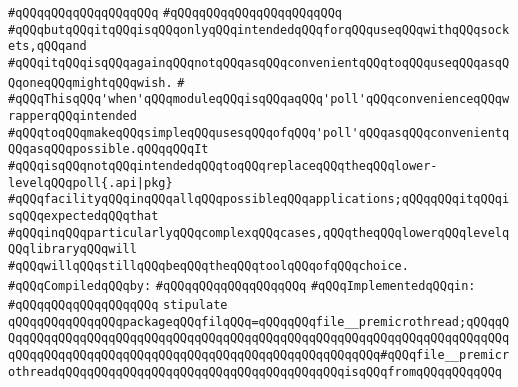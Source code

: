 \verb|#qQQqqQQqqQQqqQQqqQQq|\newline
\verb|#qQQqqQQqqQQqqQQqqQQq|\verb|qQQq|\newline
\verb|#qQQqbutqQQqitqQQqisqQQqonlyqQQqintendedqQQqforqQQquseqQQqwithqQQqsockets,qQQqand|\newline
\verb|#qQQqitqQQqisqQQqagainqQQqnotqQQqasqQQqconvenientqQQqtoqQQquseqQQqasqQQqoneqQQqmightqQQqwish.|\newline
\verb|#|\newline
\verb|#qQQqThisqQQq'when'qQQqmoduleqQQqisqQQqaqQQq'poll'qQQqconvenienceqQQqwrapperqQQqintended|\newline
\verb|#qQQqtoqQQqmakeqQQqsimpleqQQqusesqQQqofqQQq'poll'qQQqasqQQqconvenientqQQqasqQQqpossible.qQQqqQQqIt|\newline
\verb|#qQQqisqQQqnotqQQqintendedqQQqtoqQQqreplaceqQQqtheqQQqlower-levelqQQqpoll{.api|\verb#|pkg}#\newline
\verb|#qQQqfacilityqQQqinqQQqallqQQqpossibleqQQqapplications;qQQqqQQqitqQQqisqQQqexpectedqQQqthat|\newline
\verb|#qQQqinqQQqparticularlyqQQqcomplexqQQqcases,qQQqtheqQQqlowerqQQqlevelqQQqlibraryqQQqwill|\newline
\verb|#qQQqwillqQQqstillqQQqbeqQQqtheqQQqtoolqQQqofqQQqchoice.|\newline
\newline
\verb|#qQQqCompiledqQQqby:|\newline
\verb|#qQQqqQQqqQQqqQQqqQQq|\newline
\newline
\verb|#qQQqImplementedqQQqin:|\newline
\verb|#qQQqqQQqqQQqqQQqqQQq|\newline
\newline
\newline
\verb|stipulate|\newline
\verb|qQQqqQQqqQQqqQQqpackageqQQqfilqQQq=qQQqqQQqfile__premicrothread;qQQqqQQqqQQqqQQqqQQqqQQqqQQqqQQqqQQqqQQqqQQqqQQqqQQqqQQqqQQqqQQqqQQqqQQqqQQqqQQqqQQqqQQqqQQqqQQqqQQqqQQqqQQqqQQqqQQqqQQqqQQqqQQq#qQQqfile__premicrothreadqQQqqQQqqQQqqQQqqQQqqQQqqQQqqQQqqQQqqQQqisqQQqfromqQQqqQQqqQQq|\newline
